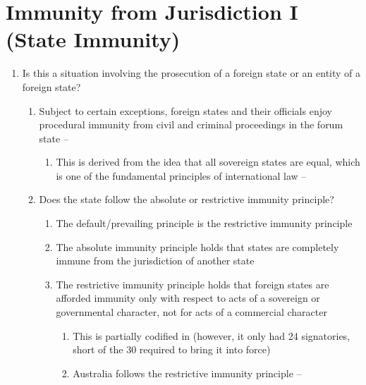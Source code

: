 \section{Immunity from Jurisdiction I (State Immunity)}
\begin{enumerate}
    \item Is this a situation involving the prosecution of a foreign state or an entity of a foreign state?
    \begin{enumerate}
        \item Subject to certain exceptions, foreign states and their officials enjoy procedural immunity from civil and criminal proceedings in the forum state -- 
        \begin{enumerate}
            \item This is derived from the idea that all sovereign states are equal, which is one of the fundamental principles of international law -- 
        \end{enumerate}
        \item Does the state follow the absolute or restrictive immunity principle?
        \begin{enumerate}
            \item The default/prevailing principle is the restrictive immunity principle
            \item The absolute immunity principle holds that states are completely immune from the jurisdiction of another state
            \item The restrictive immunity principle holds that foreign states are afforded immunity only with respect to acts of a sovereign or governmental character, not for acts of a commercial character
            \begin{enumerate}
                \item This is partially codified in  (however, it only had 24 signatories, short of the 30 required to bring it into force)
                \item Australia follows the restrictive immunity principle -- 
            \end{enumerate}
        \end{enumerate}
    \end{enumerate}

\end{enumerate}

